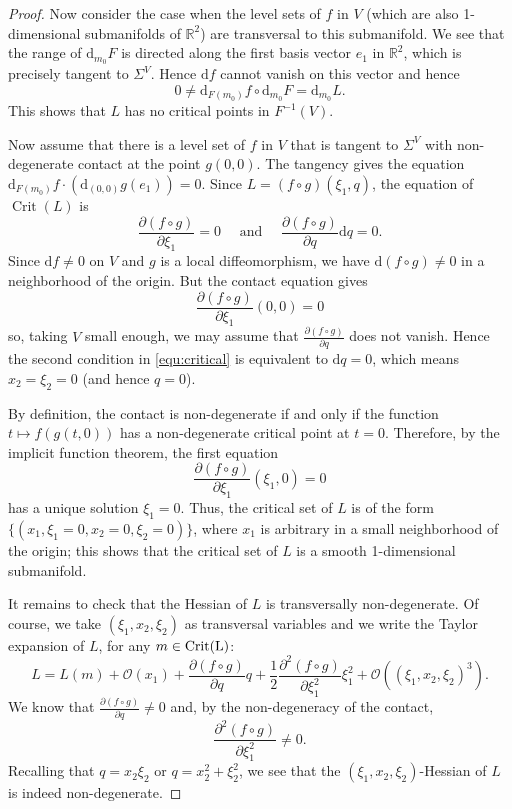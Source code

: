 \documentclass[11pt]{article}
\newcommand{\DD}{\mathrm{d}}
\newcommand{\deriv}[2]{\frac{\partial #1}{\partial #2}}
\newcommand{\RM}{\mathbb{R}}
\begin{document}
\begin{proof}
Now consider the case when the level sets of $f$ in $V$ (which are
also 1-dimensional submanifolds of $\RM^2$) are transversal to this
submanifold. We see that the range of $\DD_{m_0}F$ is directed
along the first basis vector $e_1$ in $\RM^2$, which is precisely
tangent to $\Sigma^V$.  Hence $\DD f$ cannot vanish on this vector and
hence
$$
0\neq \DD_{F(m_0)}f\circ \DD_{m_0}F= \DD_{m_0} L.
$$ 
This shows that $L$ has no critical points in $F^{-1}(V)$.

Now assume that there is a level set of $f$ in $V$ that is tangent to
$\Sigma^V$ with non-degenerate contact at the point $g(0,0)$. The
tangency gives the equation $\DD_{F(m_0)} f\cdot (\DD_{(0,0)}g
(e_1))=0$.  Since $L=(f\circ g)(\xi_1,q)$, the equation of
$\operatorname{Crit}(L)$ is
\begin{equation}
  \label{equ:critical}
  \deriv{(f\circ g)}{\xi_1}=0 \quad \text{ and } \quad 
  \deriv{(f\circ g)}{q} \DD q =0.
\end{equation}
Since $\DD f\neq 0$ on $V$ and $g$ is a local diffeomorphism, we have
$\DD (f\circ g)\neq 0$ in a neighborhood of the origin. But the
contact equation gives
$$
\deriv{(f\circ g)}{\xi_1}(0,0)=0
$$ 
so, taking $V$ small enough, we may assume that $\deriv{(f\circ
  g)}{q}$ does not vanish. Hence the second condition in
\eqref{equ:critical} is equivalent to $\DD q=0$, which means
$x_2=\xi_2=0$ (and hence $q=0$).

By definition, the contact is non-degenerate if and only if the
function $t\mapsto f(g(t,0))$ has a non-degenerate critical point at
$t=0$. Therefore, by the implicit function theorem, the first equation
\[
\deriv{(f\circ g)}{\xi_1}(\xi_1,0)=0
\]
has a unique solution $\xi_1=0$. Thus, the critical set of $L$ is of
the form $\{(x_1,\xi_1=0, x_2=0,\xi_2=0)\}$, where $x_1$ is arbitrary
in a small neighborhood of the origin; this shows that the critical
set of $L$ is a smooth 1-dimensional submanifold.

It remains to check that the Hessian of $L$ is transversally
non-degenerate. Of course, we take $(\xi_1,x_2,\xi_2)$ as transversal
variables and we write the Taylor expansion of $L$, for any
$m\in\textup{Crit(L)}$:
\begin{equation}
  L= L(m) + \mathcal{O}(x_1) + \deriv{(f\circ g)}{q} q +
  \frac{1}{2}\frac{\partial^2 (f\circ g)}{\partial \xi_1^2} 
  \xi_1^2 + \mathcal{O}((\xi_1,x_2,\xi_2)^3).
  \label{equ:hessian-rank-one}
\end{equation}
We know that $\deriv{(f\circ g)}{q}\neq 0$ and, by the non-degeneracy
of the contact,
$$
\frac{\partial^2 (f\circ g)}{\partial \xi_1^2}\neq 0.
$$ Recalling that $q=x_2\xi_2$ or
$q=x_2^2+\xi_2^2$, we see that the $(\xi_1,x_2,\xi_2)$-Hessian of $L$
is indeed non-degenerate.



\end{proof}
\end{document}
